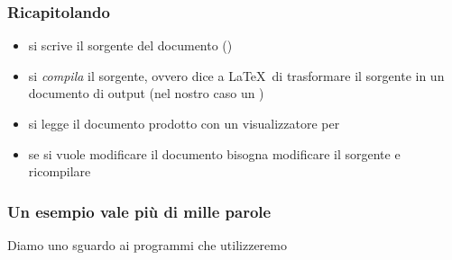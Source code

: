 \documentclass[svgnames,%
	ucs,%
	pdftex]{guitbeamer}
\begin{document}
\begin{frame}
  \frametitle{Ricapitolando} 
	\begin{itemize}[<+->]
		\item si scrive il sorgente del documento ()
		\item si \emph{compila} il sorgente, ovvero dice a \LaTeX\ di trasformare il sorgente in un documento di output (nel nostro caso un )
		\item si legge il documento prodotto con un visualizzatore per 
		\item se si vuole modificare il documento bisogna modificare il	sorgente e ricompilare
	\end{itemize}
\end{frame}
\begin{frame}
  \frametitle{Un esempio vale pi\`u di mille parole}
	\begin{center}
		Diamo uno sguardo ai programmi che utilizzeremo
	\end{center}
\end{frame}
\end{document}
